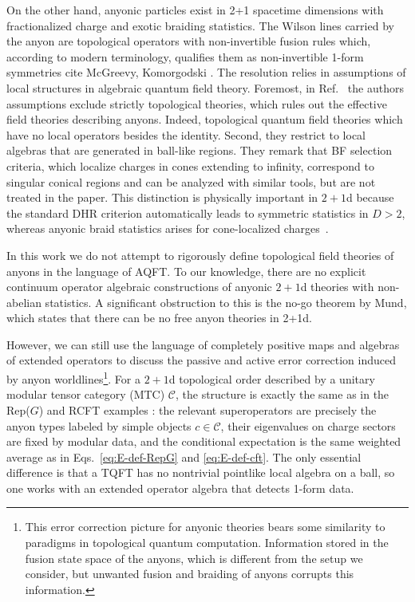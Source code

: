 \documentclass{article}
\theoremstyle{definition}
\begin{document}
  On the other hand, anyonic particles exist in 2+1 spacetime dimensions with fractionalized
  charge and exotic braiding statistics. The Wilson lines carried by the anyon
  are topological operators with non-invertible fusion rules which, according to
  modern terminology, qualifies them as non-invertible 1-form symmetries
  \color{brown}
  cite McGreevy, Komorgodski
  \color{black}
  . The resolution relies in assumptions of local structures in algebraic quantum
  field theory. Foremost, in Ref.~\cite{casini2025generalizationdhrtheoremhigher}
  the authors assumptions exclude strictly topological theories, which rules out
  the effective field theories describing anyons. Indeed, topological quantum field
  theories which have no local operators besides the identity. Second, they restrict
  to local algebras that are generated in ball-like regions. They remark that BF
  selection criteria, which localize charges in cones extending to infinity,
  correspond to singular conical regions and can be analyzed with similar tools,
  but are not treated in the paper. This distinction is physically important in
  $2+1$d because the standard DHR criterion automatically leads to symmetric statistics
  in $D>2$, whereas anyonic braid statistics arises for cone-localized charges~\cite{fredenhagen1989braid,frohlich1990braid,
  naaijkens2011stringlike,plaschkeAnyonsThesis}.

  In this work we do not attempt to rigorously define topological field theories
  of anyons in the language of AQFT.  \color{blue}
To our knowledge, there are no explicit continuum operator algebraic constructions of anyonic $2+1$d theories with non-abelian statistics.  A significant obstruction to this is the no-go theorem by Mund, which states that there can be no free anyon theories in 2+1d.
\color{black}
  
  However, we can still use the language of
  completely positive maps and algebras of extended operators to discuss the
  passive and active error correction induced by anyon worldlines\footnote{This
  error correction picture for anyonic theories bears some similarity to
  paradigms in topological quantum computation. Information stored in the fusion
  state space of the anyons, which is different from the setup we consider, but unwanted
  fusion and braiding of anyons corrupts this information.}. For a $2+1$d topological
  order described by a unitary modular tensor category (MTC) $\mathcal{C}$, the
  structure is exactly the same as in the Rep($G$) and RCFT examples : the relevant
  superoperators are precisely the anyon types labeled by simple objects $c\in\mathcal{C}$,
  their eigenvalues on charge sectors are fixed by modular data, and the conditional
  expectation is the same weighted average as in Eqs.~\eqref{eq:E-def-RepG} and \eqref{eq:E-def-cft}.
  The only essential difference is that a TQFT has no nontrivial pointlike local
  algebra on a ball, so one works with an extended operator algebra that detects
  1-form data.
\end{document}
